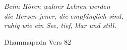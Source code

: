 \cleartorecto
\begin{quotepage}{60mm}
\centering
\itshape
Beim Hören wahrer Lehren werden\\
die Herzen jener, die empfänglich sind,\\
ruhig wie ein See, tief, klar und still.

{\smaller Dhammapada Vers 82}
\end{quotepage}

